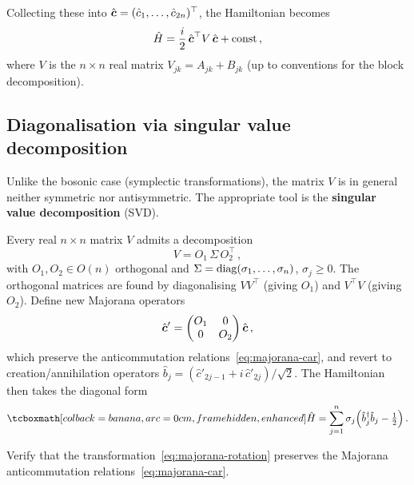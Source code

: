 Collecting these into
$\hat{\boldsymbol{c}} = (\hat{c}_1, \ldots, \hat{c}_{2n})^\top$, the
Hamiltonian becomes
\begin{equation}\label{eq:H-majorana}
  \hat{H}
  = \frac{i}{2}\,\hat{\boldsymbol{c}}^\top V\, \hat{\boldsymbol{c}}
  + \text{const}\,,
\end{equation}
where $V$ is the $n \times n$ real matrix $V_{jk} = A_{jk} + B_{jk}$
(up to conventions for the block decomposition).

\subsection{Diagonalisation via singular value decomposition}%
\label{sec:fermion-svd}

Unlike the bosonic case (symplectic transformations), the matrix $V$
is in general neither symmetric nor antisymmetric.  The appropriate
tool is the \textbf{singular value decomposition} (SVD).

\begin{keyresult}
  Every real $n \times n$ matrix $V$ admits a decomposition
  \begin{equation}\label{eq:svd}
    V = O_1\, \Sigma\, O_2^\top\,,
  \end{equation}
  with $O_1, O_2 \in O(n)$ orthogonal and
  $\Sigma = \operatorname{diag}(\sigma_1, \ldots, \sigma_n)$, $\sigma_j \geq 0$.
  The orthogonal matrices are found by diagonalising $VV^\top$
  (giving $O_1$) and $V^\top V$ (giving $O_2$).  Define new Majorana
  operators
  \begin{equation}\label{eq:majorana-rotation}
    \hat{\boldsymbol{c}}'
    = \begin{pmatrix} O_1 & 0 \\ 0 & O_2 \end{pmatrix}
      \hat{\boldsymbol{c}}\,,
  \end{equation}
  which preserve the anticommutation
  relations~\eqref{eq:majorana-car}, and revert to
  creation/annihilation operators
  $\hat{b}_j = (\hat{c}'_{2j-1} + i\,\hat{c}'_{2j})/\sqrt{2}$.
  The Hamiltonian then takes the diagonal form
  \begin{equation}\label{eq:H-diagonal-fermion}
    \eqbox{\hat{H}
    = \sum_{j=1}^{n} \sigma_j
      \Bigl(\hat{b}_j^\adj \hat{b}_j
      - \tfrac{1}{2}\Bigr)}\,.
  \end{equation}
\end{keyresult}

\begin{exercise}\label{ex:canonical-fermion}
  Verify that the transformation~\eqref{eq:majorana-rotation}
  preserves the Majorana anticommutation
  relations~\eqref{eq:majorana-car}.
\end{exercise}

